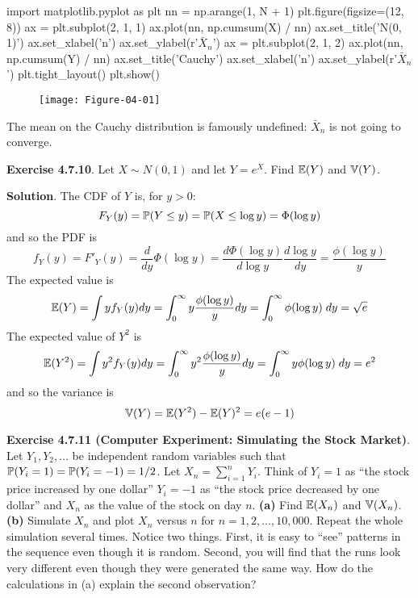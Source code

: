 \begin{python}
import matplotlib.pyplot as plt
nn = np.arange(1, N + 1)
plt.figure(figsize=(12, 8))
ax = plt.subplot(2, 1, 1)
ax.plot(nn, np.cumsum(X) / nn)
ax.set_title('N(0, 1)')
ax.set_xlabel('n')
ax.set_ylabel(r'$\bar{X}_{n}$')
ax = plt.subplot(2, 1, 2)
ax.plot(nn, np.cumsum(Y) / nn)
ax.set_title('Cauchy')
ax.set_xlabel('n')
ax.set_ylabel(r'$\bar{X}_{n}$')
plt.tight_layout()
plt.show()
\end{python}

\begin{figure}[H]
\centering
\texttt{[image: Figure-04-01]}
\end{figure}

The mean on the Cauchy distribution is famously undefined:
\(\bar{X}_ n\) is not going to converge.

\textbf{Exercise 4.7.10}. Let \(X \sim N(0, 1)\) and let \(Y = e^X\).
Find \(\operatorname{\mathbb{E}}(Y)\) and \(\operatorname{\mathbb{V}}(Y)\).

\textbf{Solution}.
The CDF of \(Y\) is, for \(y > 0\):
\[
F_Y(y) = \operatorname{\mathbb{P}}(Y \leq y) = \operatorname{\mathbb{P}}(X \leq \log y) = \Phi(\log y)
\]
and so the PDF is
\[
f_Y(y) = F'_Y(y) = \frac{d}{dy} \Phi(\log y) = \frac{d \Phi(\log y)}{d \log y} \frac{d \log y}{dy} = \frac{\phi(\log y)}{y}
\]
The expected value is
\[
\operatorname{\mathbb{E}}(Y) = \int y f_Y(y) dy = \int_{0}^{\infty} y \frac{\phi(\log y)}{y} dy = \int_{0}^{\infty} \phi(\log y)\; dy = \sqrt{e}
\]
The expected value of \(Y^{2}\) is
\[
\operatorname{\mathbb{E}}(Y^{2}) = \int y^{2} f_Y(y) dy = \int_{0}^{\infty} y^{2} \frac{\phi(\log y)}{y} dy = \int_{0}^{\infty} y \phi(\log y)\; dy = e^{2}
\]
and so the variance is
\[
\operatorname{\mathbb{V}}(Y) = \operatorname{\mathbb{E}}(Y^{2}) - \operatorname{\mathbb{E}}(Y)^{2} = e(e - 1)
\]

\textbf{Exercise 4.7.11 (Computer Experiment: Simulating the Stock
Market)}. Let \(Y_{1}, Y_{2}, \dots\) be independent random variables such
that \(\operatorname{\mathbb{P}}(Y_{i} = 1) = \operatorname{\mathbb{P}}(Y_{i} = -1) = 1/2\). Let
\(X_{n} = \sum_{i=1}^{n} Y_{i}\). Think of \(Y_{i} = 1\) as ``the stock price
increased by one dollar'' \(Y_{i} = -1\) as ``the stock price decreased by
one dollar'' and \(X_{n}\) as the value of the stock on day \(n\).
\textbf{(a)} Find \(\operatorname{\mathbb{E}}(X_{n})\) and \(\operatorname{\mathbb{V}}(X_{n})\).
\textbf{(b)} Simulate \(X_{n}\) and plot \(X_{n}\) versus \(n\) for
\(n = 1, 2, \dots, 10,000\). Repeat the whole simulation several times.
Notice two things. First, it is easy to ``see'' patterns in the sequence
even though it is random. Second, you will find that the runs look very
different even though they were generated the same way. How do the
calculations in (a) explain the second observation?

